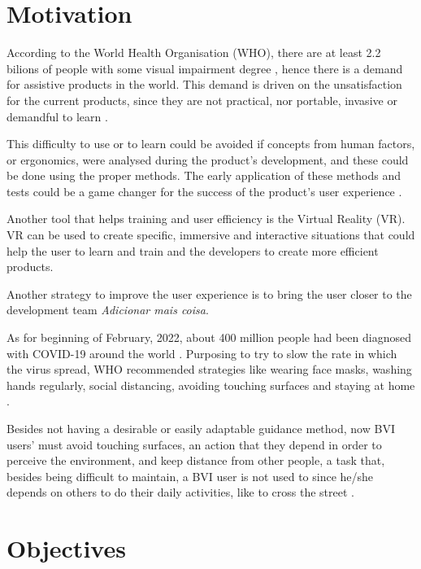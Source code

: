 \section{Motivation}


According to the World Health Organisation (WHO), there are at least 2.2 bilions of people with some visual impairment degree \cite{world2019world}, hence there is a demand for assistive products in the world. This demand is driven on the unsatisfaction for the current products, since they are not practical, nor portable, invasive or demandful to learn \cite{lozano2009electrotactile}.

This difficulty to use or to learn could be avoided if concepts from human factors, or ergonomics, were analysed during the product's development, and these could be done using the proper methods. The early application of these methods and tests could be a game changer for the success of the product's user experience \cite{wolf2019towards}.

Another tool that helps training and user efficiency is the Virtual Reality (VR). VR can be used to create specific, immersive and interactive situations that could help the user to learn and train \cite{farrell2018learning} and the developers to create more efficient products.

Another strategy to improve the user experience is to bring the user closer to the development team {\textit{\large Adicionar mais coisa}}.

As for beginning of February, 2022, about 400 million people had been diagnosed with COVID-19 around the world \cite{ourworldindata_cases}. Purposing to try to slow the rate in which the virus spread, WHO recommended strategies like wearing face masks, washing hands regularly, social distancing, avoiding touching surfaces and staying at home \cite{who_2020}.

Besides not having a desirable or easily adaptable guidance method, now BVI users' must avoid touching surfaces, an action that they depend in order to perceive the environment, and keep distance from other people, a task that, besides being difficult to maintain, a BVI user is not used to since he/she depends on others to do their daily activities, like to cross the street \cite{jondani2021strategies}.

\section{Objectives}

